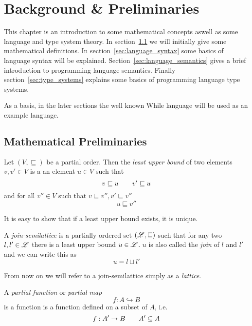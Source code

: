 \chapter{Background \& Preliminaries} \label{cha:background}

This chapter is an introduction to some mathematical concepts aswell as some
language and type system theory.  In section~\ref{sec:mathematical_definitions}
we will initially give some mathematical definitions. In
section~\ref{sec:language_syntax} some basics of language syntax will be
explained. Section~\ref{sec:language_semantics} gives a brief introduction to
programming language semantics. Finally section~\ref{sec:type_systems} explains
some basics of programming language type systems.

As a basis, in the later sections the well known While language will be used as
an example language.

\section{Mathematical Preliminaries}
\label{sec:mathematical_definitions}

\begin{definition}
  Let $(V, \sqsubseteq)$ be a partial order. Then the \emph{least upper bound}
  of two elements $v, v' \in V$ is a an element $u \in V$ such that
  \begin{equation*}
    v \sqsubseteq u \quad\quad v' \sqsubseteq u
  \end{equation*}
  and for all $v'' \in V$ such that $v \sqsubseteq v'', v' \sqsubseteq v''$
  \begin{equation*}
    u \sqsubseteq v''
  \end{equation*}
\end{definition}
It is easy to show that if a least upper bound exists, it is unique.
\begin{definition}
  A \emph{join-semilattice} is a partially ordered set $(\mbox{$\mathscr{L}$}, \sqsubseteq)$ such
  that for any two $l, l' \in \mbox{$\mathscr{L}$}$ there is a least upper bound $u \in
  \mbox{$\mathscr{L}$}$. $u$ is also called the \emph{join} of $l$ and $l'$ and we can write
  this as
  \begin{equation*}
    u = l \sqcup l'
  \end{equation*}
\end{definition}
From now on we will refer to a join-semilattice simply as a \emph{lattice}.
\begin{definition}
  A \emph{partial function} or \emph{partial map}
  \begin{equation*}
    f: A \hookrightarrow B
  \end{equation*}
  is a function is a function defined on a subset of $A$, i.e.
  \begin{equation*}
    f: A' \to B \quad\quad A' \subseteq A
  \end{equation*}
\end{definition}



